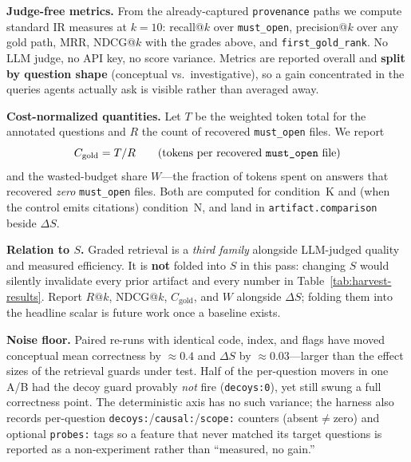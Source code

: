 \medskip
\noindent\textbf{Judge-free metrics.}  From the already-captured
\texttt{provenance} paths we compute standard IR measures at $k{=}10$:
recall@$k$ over \texttt{must\_open}, precision@$k$ over any gold path,
MRR, NDCG@$k$ with the grades above, and \texttt{first\_gold\_rank}.
No LLM judge, no API key, no score variance.  Metrics are reported overall and
\textbf{split by question shape} (conceptual vs.\ investigative), so a gain
concentrated in the queries agents actually ask is visible rather than averaged
away.

\medskip
\noindent\textbf{Cost-normalized quantities.}  Let $T$ be the weighted token total
for the annotated questions and $R$ the count of recovered \texttt{must\_open}
files.  We report
\[
C_{\text{gold}} = T / R
\qquad\text{(tokens per recovered \texttt{must\_open} file)}
\]
and the wasted-budget share $W$---the fraction of tokens spent on answers that
recovered \emph{zero} \texttt{must\_open} files.  Both are computed for condition~K
and (when the control emits citations) condition~N, and land in
\texttt{artifact.comparison} beside $\Delta S$.

\medskip
\noindent\textbf{Relation to $S$.}  Graded retrieval is a \emph{third family}
alongside LLM-judged quality and measured efficiency.  It is \textbf{not} folded
into $S$ in this pass: changing $S$ would silently invalidate every prior
artifact and every number in Table~\ref{tab:harvest-results}.  Report $R@k$,
NDCG@$k$, $C_{\text{gold}}$, and $W$ alongside $\Delta S$; folding them into the
headline scalar is future work once a baseline exists.

\medskip
\noindent\textbf{Noise floor.}  Paired re-runs with identical code, index, and
flags have moved conceptual mean correctness by $\approx 0.4$ and $\Delta S$ by
$\approx 0.03$---larger than the effect sizes of the retrieval guards under
test.  Half of the per-question movers in one A/B had the decoy guard
provably \emph{not} fire (\texttt{decoys:0}), yet still swung a full correctness
point.  The deterministic axis has no such variance; the harness also records
per-question \texttt{decoys:}/\texttt{causal:}/\texttt{scope:} counters
(absent$\neq$zero) and optional \texttt{probes:} tags so a feature that never
matched its target questions is reported as a non-experiment rather than
``measured, no gain.''

